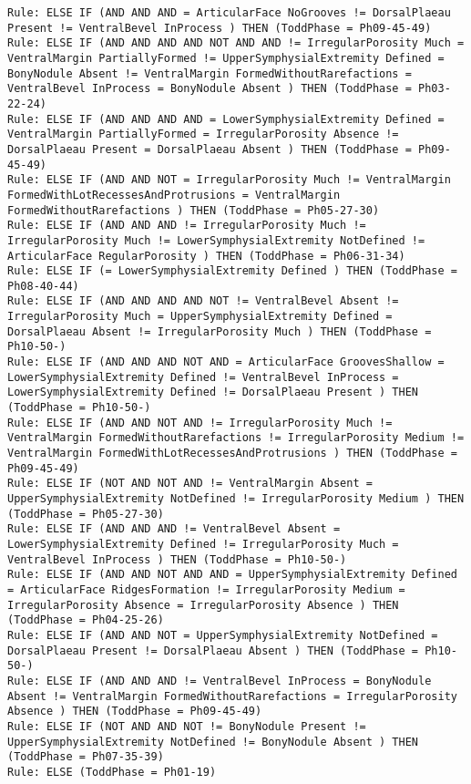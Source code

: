 \begin{lstlisting}
Rule: ELSE IF (AND AND AND = ArticularFace NoGrooves != DorsalPlaeau Present != VentralBevel InProcess ) THEN (ToddPhase = Ph09-45-49)
Rule: ELSE IF (AND AND AND AND NOT AND AND != IrregularPorosity Much = VentralMargin PartiallyFormed != UpperSymphysialExtremity Defined = BonyNodule Absent != VentralMargin FormedWithoutRarefactions = VentralBevel InProcess = BonyNodule Absent ) THEN (ToddPhase = Ph03-22-24)
Rule: ELSE IF (AND AND AND AND = LowerSymphysialExtremity Defined = VentralMargin PartiallyFormed = IrregularPorosity Absence != DorsalPlaeau Present = DorsalPlaeau Absent ) THEN (ToddPhase = Ph09-45-49)
Rule: ELSE IF (AND AND NOT = IrregularPorosity Much != VentralMargin FormedWithLotRecessesAndProtrusions = VentralMargin FormedWithoutRarefactions ) THEN (ToddPhase = Ph05-27-30)
Rule: ELSE IF (AND AND AND != IrregularPorosity Much != IrregularPorosity Much != LowerSymphysialExtremity NotDefined != ArticularFace RegularPorosity ) THEN (ToddPhase = Ph06-31-34)
Rule: ELSE IF (= LowerSymphysialExtremity Defined ) THEN (ToddPhase = Ph08-40-44)
Rule: ELSE IF (AND AND AND AND NOT != VentralBevel Absent != IrregularPorosity Much = UpperSymphysialExtremity Defined = DorsalPlaeau Absent != IrregularPorosity Much ) THEN (ToddPhase = Ph10-50-)
Rule: ELSE IF (AND AND AND NOT AND = ArticularFace GroovesShallow = LowerSymphysialExtremity Defined != VentralBevel InProcess = LowerSymphysialExtremity Defined != DorsalPlaeau Present ) THEN (ToddPhase = Ph10-50-)
Rule: ELSE IF (AND AND NOT AND != IrregularPorosity Much != VentralMargin FormedWithoutRarefactions != IrregularPorosity Medium != VentralMargin FormedWithLotRecessesAndProtrusions ) THEN (ToddPhase = Ph09-45-49)
Rule: ELSE IF (NOT AND NOT AND != VentralMargin Absent = UpperSymphysialExtremity NotDefined != IrregularPorosity Medium ) THEN (ToddPhase = Ph05-27-30)
Rule: ELSE IF (AND AND AND != VentralBevel Absent = LowerSymphysialExtremity Defined != IrregularPorosity Much = VentralBevel InProcess ) THEN (ToddPhase = Ph10-50-)
Rule: ELSE IF (AND AND NOT AND AND = UpperSymphysialExtremity Defined = ArticularFace RidgesFormation != IrregularPorosity Medium = IrregularPorosity Absence = IrregularPorosity Absence ) THEN (ToddPhase = Ph04-25-26)
Rule: ELSE IF (AND AND NOT = UpperSymphysialExtremity NotDefined = DorsalPlaeau Present != DorsalPlaeau Absent ) THEN (ToddPhase = Ph10-50-)
Rule: ELSE IF (AND AND AND != VentralBevel InProcess = BonyNodule Absent != VentralMargin FormedWithoutRarefactions = IrregularPorosity Absence ) THEN (ToddPhase = Ph09-45-49)
Rule: ELSE IF (NOT AND AND NOT != BonyNodule Present != UpperSymphysialExtremity NotDefined != BonyNodule Absent ) THEN (ToddPhase = Ph07-35-39)
Rule: ELSE (ToddPhase = Ph01-19)
\end{lstlisting}

